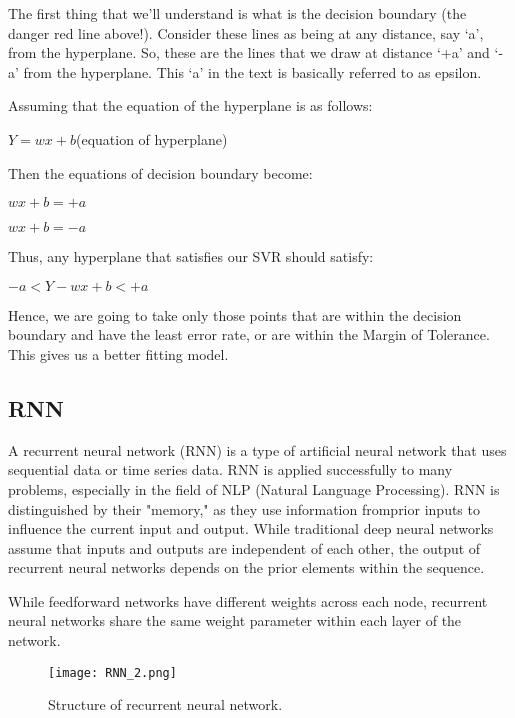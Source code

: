 \documentclass{ieeeojies}
\begin{document}
The first thing that we’ll understand is what is the decision boundary (the danger red line above!). Consider these lines as being at any distance, say ‘a’, from the hyperplane. So, these are the lines that we draw at distance ‘+a’ and ‘-a’ from the hyperplane. This ‘a’ in the text is basically referred to as epsilon.

Assuming that the equation of the hyperplane is as follows:
\begin{center}
    \(Y = wx+b\)(equation of hyperplane)
\end{center}

Then the equations of decision boundary become:
\begin{center}
    \(wx+b= +a\)
\end{center}
\begin{center}
    \(wx+b= -a\)
\end{center}

Thus, any hyperplane that satisfies our SVR should satisfy:
\begin{center}
    \(-a < Y- wx+b < +a\)
\end{center}

Hence, we are going to take only those points that are within the decision boundary and have the least error rate, or are within the Margin of Tolerance. This gives us a better fitting model.\cite{r15}


\subsection{RNN}
A recurrent neural network (RNN) is a type of artificial neural network that uses sequential data or time series data. RNN is applied successfully to many problems, especially in the
field of NLP (Natural Language Processing). RNN is
distinguished by their "memory," as they use information fromprior inputs to influence the current input and output. While traditional deep neural networks assume that inputs and outputs
are independent of each other, the output of recurrent neural networks depends on the prior elements within the sequence.

While feedforward networks have different weights across each node, recurrent neural networks share the same weight parameter within each layer of the network.
\begin{figure}[!ht]
      \centering
      \texttt{[image: RNN\_2.png]} 
      \caption{Structure of recurrent neural network.}
      \label{fig:ten_anh}
    \end{figure}
    
\end{document}
